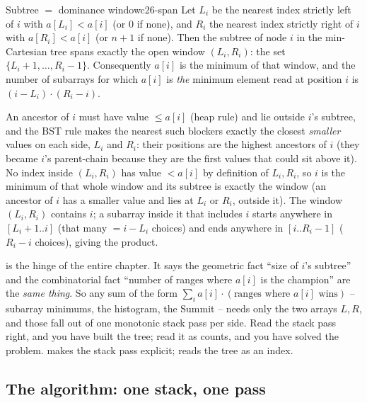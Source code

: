 \begin{lemma}{Subtree $=$ dominance window}{c26-span}
Let $L_i$ be the nearest index strictly left of $i$ with $a[L_i] < a[i]$ (or $0$ if none), and $R_i$ the
nearest index strictly right of $i$ with $a[R_i] < a[i]$ (or $n{+}1$ if none). Then the subtree of node
$i$ in the min-Cartesian tree spans exactly the open window $(L_i, R_i)$: the set
$\{L_i+1,\dots,R_i-1\}$. Consequently $a[i]$ is the minimum of that window, and the number of
subarrays for which $a[i]$ is \emph{the} minimum element read at position $i$ is
$(i-L_i)\cdot(R_i-i)$.
\end{lemma}
\begin{proofbox}
An ancestor of $i$ must have value $\le a[i]$ (heap rule) and lie outside $i$'s subtree, and the BST
rule makes the nearest such blockers exactly the closest \emph{smaller} values on each side, $L_i$ and
$R_i$: their positions are the highest ancestors of $i$ (they became $i$'s parent-chain because they
are the first values that could sit above it). No index inside $(L_i,R_i)$ has value $<a[i]$ by
definition of $L_i,R_i$, so $i$ is the minimum of that whole window and its subtree is exactly the
window (an ancestor of $i$ has a smaller value and lies at $L_i$ or $R_i$, outside it). The window
$(L_i,R_i)$ contains $i$; a subarray inside it that includes $i$ starts anywhere in $[L_i+1..i]$ (that
many $= i-L_i$ choices) and ends anywhere in $[i..R_i-1]$ ($R_i-i$ choices), giving the product. \end{proofbox}

\begin{insightbox}
 is the hinge of the entire chapter. It says the geometric fact ``size of $i$'s
subtree'' and the combinatorial fact ``number of ranges where $a[i]$ is the champion'' are the
\emph{same thing}. So any sum of the form $\sum_i a[i]\cdot(\text{ranges where } a[i] \text{ wins})$ --
subarray minimums, the histogram, the Summit -- needs only the two arrays $L,R$, and those fall out of
one monotonic stack pass per side. Read the stack pass right, and you have built the tree; read it as
counts, and you have solved the problem.  makes the stack pass explicit;  reads the tree as an index.
\end{insightbox}

\subsection{The algorithm: one stack, one pass}

